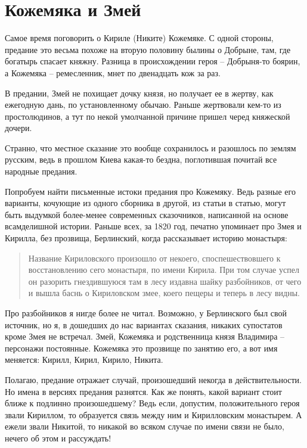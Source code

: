 \chapter{Кожемяка и Змей}

Самое время поговорить о Кириле (Никите) Кожемяке. С одной стороны, предание это весьма похоже на вторую половину былины о Добрыне, там, где богатырь спасает княжну. Разница в происхождении героя – Добрыня-то боярин, а Кожемяка – ремесленник, мнет по двенадцать кож за раз.

В предании, Змей не похищает дочку князя, но получает ее в жертву, как ежегодную дань, по установленному обычаю. Раньше жертвовали кем-то из простолюдинов, а тут по некой умолчанной причине пришел черед княжеской дочери.

Странно, что местное сказание это вообще сохранилось и разошлось по землям русским, ведь в прошлом Киева какая-то бездна, поглотившая почитай все народные предания.

Попробуем найти письменные истоки предания про Кожемяку. Ведь разные его варианты, кочующие из одного сборника в другой, из статьи в статью, могут быть выдумкой более-менее современных сказочников, написанной на основе всамделишной истории. Раньше всех, за 1820 год, печатно упоминает про Змея и Кирилла, без прозвища, Берлинский\cite{berl01}, когда рассказывает историю монастыря: 

\begin{quotation}
Название Кириловского произошло от некоего, споспешествовшего к восстановлению сего монастыря, по имени Кирила. При том случае успел он разорить гнездившуюся там в лесу издавна шайку разбойников, от чего и вышла баснь о Кириловском змее, коего пещеры и теперь в лесу видны.
\end{quotation}

Про разбойников я нигде более не читал. Возможно, у Берлинского был свой источник, но я, в дошедших до нас вариантах сказания, никаких супостатов кроме Змея не встречал. Змей, Кожемяка и родственница князя Владимира – персонажи постоянные. Кожемяка это прозвище по занятию его, а вот имя меняется: Кирилл, Кирил, Кирило, Никита.

Полагаю, предание отражает случай, произошедший некогда в действительности. Но имена в версиях предания разнятся. Как же понять, какой вариант стоит ближе к подлинно произошедшему? Ведь если, допустим, положительного героя звали Кириллом, то образуется связь между ним и Кирилловским монастырем. А ежели звали Никитой, то никакой во всяком случае по имени связи не было, нечего об этом и рассуждать! 

